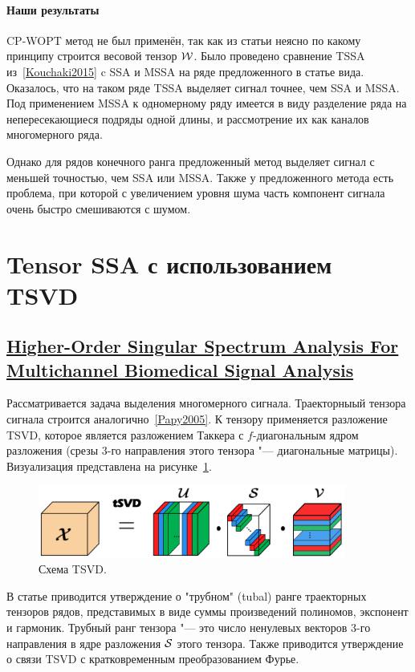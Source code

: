 \documentclass[12pt]{article}
\theoremstyle{plain}
\theoremstyle{definition}
\theoremstyle{remark}
\begin{document}
\paragraph{Наши результаты}
CP-WOPT метод не был применён, так как из статьи неясно по какому
принципу строится весовой тензор $\mathcal{W}$.
Было проведено сравнение TSSA из~\ref{Kouchaki2015} c SSA и MSSA на
ряде предложенного в статье вида.
Оказалось, что на таком ряде TSSA выделяет сигнал точнее, чем SSA и MSSA.
Под применением MSSA к одномерному ряду имеется в виду разделение
ряда на непересекающиеся подряды одной длины, и рассмотрение их как
каналов многомерного ряда.

Однако для рядов конечного ранга предложенный метод выделяет сигнал с
меньшей точностью, чем SSA или MSSA.
Также у предложенного метода есть проблема, при которой с увеличением
уровня шума часть компонент сигнала очень быстро смешиваются с шумом.

\section{Tensor SSA с использованием TSVD}
\subsection{\href{https://doi.org/10.23919/EUSIPCO63174.2024.10715293}{Higher-Order
Singular Spectrum Analysis For Multichannel Bio\-medical Signal Analysis}}
\label{}
Рассматривается задача выделения многомерного сигнала.
Траекторныый тензора сигнала строится аналогично~\ref{Papy2005}.
К тензору применяется разложение TSVD, которое является разложением Таккера
с $f$-диагональным ядром разложения (срезы 3-го направления этого тензора
"--- диагональные матрицы).
Визуализация представлена на рисунке~\ref{fig:tsvd_scheme}.
\begin{figure}[!ht]
  \centering
  \includegraphics[width=0.9\textwidth]{TrungLe2024_tsvd}
  \caption{Схема TSVD.}\label{fig:tsvd_scheme}
\end{figure}

В статье приводится утверждение о "трубном" (tubal) ранге траекторных
тензоров рядов, представимых в виде суммы произведений полиномов,
экспонент и гармоник.
Трубный ранг тензора "--- это число ненулевых векторов 3-го
направления в ядре разложения $\mathcal{S}$ этого тензора.
Также приводится утверждение о связи TSVD с кратковременным
преобразованием Фурье.
\end{document}
